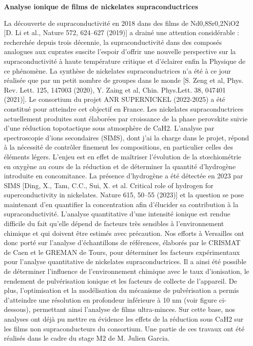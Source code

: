 \bigskip
\textbf{\textsf{Analyse ionique de films de nickelates supraconductrices}}

La découverte de supraconductivité en 2018 dans des films de Nd0,8Sr0,2NiO2 [D. Li et al., Nature 572, 624–627 (2019)] a drainé une attention considérable : recherchée depuis trois décennie, la supraconductivité dans des composés analogues aux cuprates suscite l’espoir d’offrir une nouvelle perspective sur la supraconductivité à haute température critique et d’éclairer enfin la Physique de ce phénomène. La synthèse de nickelates supraconductrices n’a été à ce jour réalisée que par un petit nombre de groupes dans le monde [S. Zeng et al, Phys. Rev. Lett. 125, 147003 (2020), Y. Zaing et al, Chin. Phys.Lett. 38, 047401 (2021)]. Le consortium du projet ANR SUPERNICKEL (2022-2025) a été constitué pour atteindre cet objectif en France.
Les nickelates supraconductrices actuellement produites sont élaborées par croissance de la phase perovskite suivie d’une réduction topotactique sous atmosphère de CaH2. L’analyse par spectroscopie d’ions secondaires (SIMS), dont j’ai la charge dans le projet, répond à la nécessité de contrôler finement les compositions, en particulier celles des éléments légers. L’enjeu est en effet de maîtriser l’évolution de la stœchiométrie en oxygène au cours de la réduction et de déterminer la quantité d’hydrogène introduite en concomitance. La présence d’hydrogène a été détectée en 2023 par SIMS [Ding, X., Tam, C.C., Sui, X. et al. Critical role of hydrogen for superconductivity in nickelates. Nature 615, 50–55 (2023)] et la question se pose maintenant d’en quantifier la concentration afin d’élucider sa contribution à la supraconductivité.
L’analyse quantitative d’une intensité ionique est rendue difficile du fait qu’elle dépend de facteurs très sensibles à l’environnement chimique et qui doivent être estimés avec précaution. Nos efforts à Versailles ont donc porté sur l'analyse d'échantillons de références, élaborés par le CRISMAT de Caen et le GREMAN de Tours, pour déterminer les facteurs expérimentaux pour l’analyse quantitative de nickelates supraconductrices. Il a ainsi été possible de déterminer l’influence de l’environnement chimique avec le taux d’ionisation, le rendement de pulvérisation ionique et les facteurs de collecte de l’appareil. De plus, l’optimisation et la modélisation du mécanisme de pulvérisation a permis d’atteindre une résolution en profondeur inférieure à 10 nm (voir figure ci-dessous), permettant ainsi l’analyse de films ultra-minces. Sur cette base, nos analyses ont déjà pu mettre en évidence les effets de la réduction sous CaH2 sur les films non supraconducteurs du consortium. Une partie de ces travaux ont été réalisés dans le cadre du stage M2 de M. Julien Garcia.


